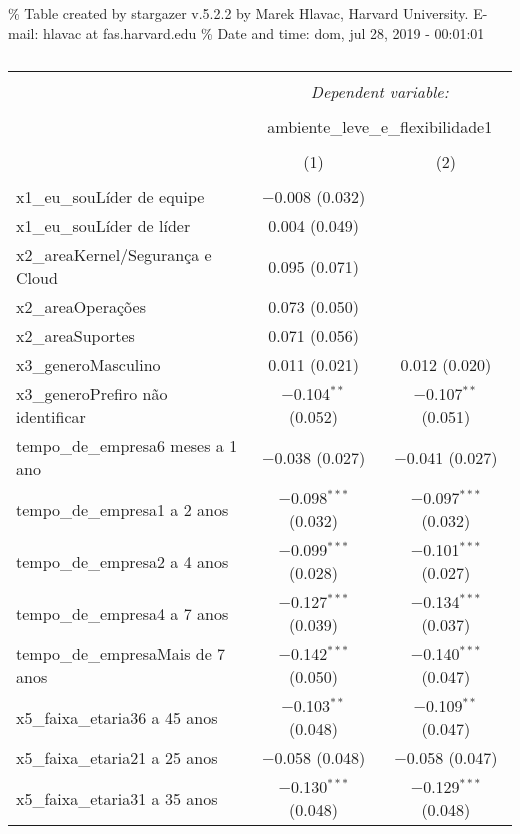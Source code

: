 \documentclass[]{book}
\begin{document}
\% Table created by stargazer v.5.2.2 by Marek Hlavac, Harvard University. E-mail: hlavac at fas.harvard.edu
\% Date and time: dom, jul 28, 2019 - 00:01:01

\begin{table}[!htbp] \centering 
  \caption{} 
  \label{} 
\begin{tabular}{@{\extracolsep{5pt}}lcc} 
\\[-1.8ex]\hline 
\hline \\[-1.8ex] 
 & \multicolumn{2}{c}{\textit{Dependent variable:}} \\ 
\cline{2-3} 
\\[-1.8ex] & \multicolumn{2}{c}{ambiente\_leve\_e\_flexibilidade1} \\ 
\\[-1.8ex] & (1) & (2)\\ 
\hline \\[-1.8ex] 
 x1\_eu\_souLíder de equipe & $-$0.008 (0.032) &  \\ 
  x1\_eu\_souLíder de líder & 0.004 (0.049) &  \\ 
  x2\_areaKernel/Segurança e Cloud & 0.095 (0.071) &  \\ 
  x2\_areaOperações & 0.073 (0.050) &  \\ 
  x2\_areaSuportes & 0.071 (0.056) &  \\ 
  x3\_generoMasculino & 0.011 (0.021) & 0.012 (0.020) \\ 
  x3\_generoPrefiro não identificar & $-$0.104$^{**}$ (0.052) & $-$0.107$^{**}$ (0.051) \\ 
  tempo\_de\_empresa6 meses a 1 ano & $-$0.038 (0.027) & $-$0.041 (0.027) \\ 
  tempo\_de\_empresa1 a 2 anos & $-$0.098$^{***}$ (0.032) & $-$0.097$^{***}$ (0.032) \\ 
  tempo\_de\_empresa2 a 4 anos & $-$0.099$^{***}$ (0.028) & $-$0.101$^{***}$ (0.027) \\ 
  tempo\_de\_empresa4 a 7 anos & $-$0.127$^{***}$ (0.039) & $-$0.134$^{***}$ (0.037) \\ 
  tempo\_de\_empresaMais de 7 anos & $-$0.142$^{***}$ (0.050) & $-$0.140$^{***}$ (0.047) \\ 
  x5\_faixa\_etaria36 a 45 anos & $-$0.103$^{**}$ (0.048) & $-$0.109$^{**}$ (0.047) \\ 
  x5\_faixa\_etaria21 a 25 anos & $-$0.058 (0.048) & $-$0.058 (0.047) \\ 
  x5\_faixa\_etaria31 a 35 anos & $-$0.130$^{***}$ (0.048) & $-$0.129$^{***}$ (0.048) \\ 

\end{tabular}
\end{table}
\end{document}
